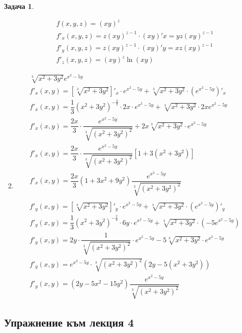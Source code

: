 \documentclass[a4paper,fleqn,12pt]{article}
\theoremstyle{definition}
\newtheorem{task}{Задача}[subsection]
\begin{document}
\begin{task}
\begin{enumerate}
\begin{gather*}
f(x,y,z) = (xy)^z\\
f'_x(x,y,z) = z(xy)^{z-1} \cdot (xy)'x = yz(xy)^{z-1}\\
f'_y(x,y,z) = z(xy)^{z-1} \cdot (xy)'y = xz(xy)^{z-1}\\
f'_z(x,y,z) = (xy)^z \ln{(xy)}
\end{gather*}
\item 
\begin{gather*}
\sqrt[3]{x^2+3y^2} e^{x^2 - 5y}\\
f'_x(x,y) = \left[ \sqrt[3]{x^2+3y^2} \right]'_x \cdot e^{x^2 - 5y} + \sqrt[3]{x^2+3y^2} \cdot (e^{x^2 - 5y})'_x\\
f'_x(x,y) = \dfrac{1}{3} (x^2 + 3y^2)^{- \frac{2}{3}} \cdot 2x  \cdot e^{x^2 - 5y} +  \sqrt[3]{x^2+3y^2}\cdot 2x e^{x^2 - 5y} \\
f'_x(x,y) = \dfrac{2x}{3} \cdot \dfrac{e^{x^2 - 5y}}{\sqrt[3]{(x^2+3y^2)^2}} + 2x \sqrt[3]{x^2+3y^2} \cdot e^{x^2 - 5y} \\
f'_x(x,y) = \dfrac{2x}{3} \cdot \dfrac{e^{x^2 - 5y}}{\sqrt[3]{(x^2+3y^2)^2}} \left[ 1 + 3(x^2 + 3y^2) \right] \\
f'_x(x,y) = \dfrac{2x}{3} (1 + 3x^2 + 9y^2) \dfrac {e^{x^2 - 5y}}{\sqrt[3]{(x^2+3y^2)^2}}\\
\\
f'_y(x,y) =  \left[ \sqrt[3]{x^2+3y^2} \right]'_y \cdot e^{x^2 - 5y} + \sqrt[3]{x^2+3y^2} \cdot (e^{x^2 - 5y})'_y\\
f'_y(x,y) = \dfrac{1}{3} (x^2 + 3y^2)^{- \frac{2}{3}} \cdot 6y  \cdot e^{x^2 - 5y} +  \sqrt[3]{x^2+3y^2}\cdot (-5e^{x^2 - 5y}) \\
f'_y(x,y) = 2y \cdot \dfrac{1}{\sqrt[3]{(x^2+3y^2)^2}} \cdot e^{x^2 - 5y} - 5  \sqrt[3]{x^2+3y^2}\cdot e^{x^2 - 5y} \\
f'_y(x,y) = e^{x^2 - 5y} \cdot \sqrt[3]{(x^2+3y^2)^2} (2y - 5(x^2 + 3y^2)) \\
f'_y(x,y) = (2y - 5x^2 - 15y^2) \dfrac{e^{x^2 - 5y}}{\sqrt[3]{(x^2+3y^2)^2}}
\end{gather*}
\end{enumerate}
\end{task}

\newpage
\subsection{Упражнение към лекция 4}
\end{document}
